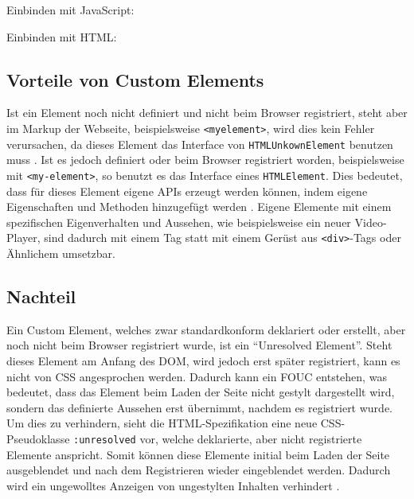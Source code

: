 Einbinden mit JavaScript:

\begin{Shaded}
\begin{Highlighting}[]
  \OperatorTok{;}
\end{Highlighting}
\end{Shaded}

Einbinden mit HTML:

\begin{Shaded}
\begin{Highlighting}[]
\KeywordTok{>}
\end{Highlighting}
\end{Shaded}


\subsection{Vorteile von Custom Elements}\label{vorteile-von-custom-elements}

Ist ein Element noch nicht definiert und nicht beim Browser registriert, steht aber im Markup der Webseite, beispielsweise \texttt{\textless{}myelement\textgreater{}}, wird dies kein Fehler verursachen, da dieses Element das Interface von \texttt{HTMLUnkownElement} benutzen muss \cite{citeulike:13851253}. Ist es jedoch definiert oder beim Browser registriert worden, beispielsweise mit \texttt{\textless{}my-element\textgreater{}}, so benutzt es das Interface eines \texttt{HTMLElement}. Dies bedeutet, dass für dieses Element eigene APIs erzeugt werden können, indem eigene Eigenschaften und Methoden hinzugefügt werden \cite{citeulike:13844982}. Eigene Elemente mit einem spezifischen Eigenverhalten und Aussehen, wie beispielsweise ein neuer Video-Player, sind dadurch mit einem Tag statt mit einem Gerüst aus \texttt{\textless{}div\textgreater{}}-Tags oder Ähnlichem umsetzbar.


\subsection{Nachteil}\label{nachteile-von-custom-elements}

Ein Custom Element, welches zwar standardkonform deklariert oder erstellt, aber noch nicht beim Browser registriert wurde, ist ein ``Unresolved Element''. Steht dieses Element am Anfang des DOM, wird jedoch erst später registriert, kann es nicht von CSS angesprochen werden. Dadurch kann ein FOUC entstehen, was bedeutet, dass das Element beim Laden der Seite nicht gestylt dargestellt wird, sondern das definierte Aussehen erst übernimmt, nachdem es registriert wurde. Um dies zu verhindern, sieht die HTML-Spezifikation eine neue CSS-Pseudoklasse \texttt{:unresolved} vor, welche deklarierte, aber nicht registrierte Elemente anspricht. Somit können diese Elemente initial beim Laden der Seite ausgeblendet und nach dem Registrieren wieder eingeblendet werden. Dadurch wird ein ungewolltes Anzeigen von ungestylten Inhalten verhindert \cite{citeulike:13844984}.

